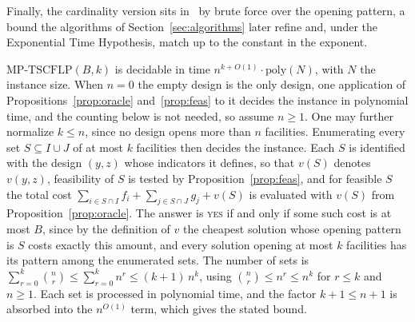Finally, the cardinality version sits in \XP\ by brute force over the
opening pattern, a bound the algorithms of
Section~\ref{sec:algorithms} later refine and, under the Exponential
Time Hypothesis, match up to the constant in the exponent.

\begin{observation}[membership in \XP]\label{obs:xp}
$\mathrm{MP\text{-}TSCFLP}(B,k)$ is decidable in time
$n^{k+O(1)}\cdot\mathrm{poly}(N)$, with $N$ the instance size. When $n=0$ the empty
design is the only design, one application of
Propositions~\ref{prop:oracle} and~\ref{prop:feas} to it decides the
instance in polynomial time, and the counting below is not needed, so
assume $n\ge 1$. One may further normalize $k\le n$, since no design
opens more than $n$ facilities. Enumerating every set
$S\subseteq I\cup J$ of at most $k$ facilities then decides the
instance. Each $S$ is identified with the design $(y,z)$ whose
indicators it defines, so that $v(S)$ denotes $v(y,z)$, feasibility of
$S$ is tested by Proposition~\ref{prop:feas}, and for feasible $S$ the
total cost
$\sum_{i\in S\cap I}f_i+\sum_{j\in S\cap J}g_j+v(S)$ is evaluated with
$v(S)$ from
Proposition~\ref{prop:oracle}. The answer is \textsc{yes} if and only if
some such cost is at most $B$, since by the definition of $v$ the
cheapest solution whose opening pattern is $S$ costs exactly this
amount, and every solution opening at most $k$ facilities has its
pattern among the enumerated sets. The number of sets is
$\sum_{r=0}^{k}\binom{n}{r}\le\sum_{r=0}^{k}n^{r}\le(k+1)\,n^{k}$, using
$\binom{n}{r}\le n^{r}\le n^{k}$ for $r\le k$ and $n\ge 1$. Each set is
processed in polynomial time, and the factor $k+1\le n+1$ is absorbed
into the $n^{O(1)}$ term, which gives the stated bound.
\end{observation}
